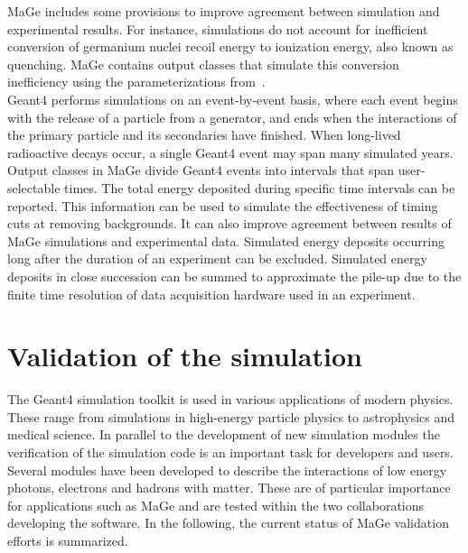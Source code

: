 \documentclass[article]{IEEEtran}
\begin{document}
     {\sc MaGe} includes some provisions to improve agreement between 
simulation and experimental results.  
For instance, simulations do not account 
for inefficient conversion of germanium nuclei recoil energy to 
ionization energy, also known as quenching.  {\sc MaGe} contains output classes that simulate this conversion inefficiency using the parameterizations from~\cite{ljungvall}. \\
 
{\sc Geant4} performs simulations on an event-by-event basis, where
each event begins with the release of a particle from a generator, and
ends when the interactions of the primary particle and its secondaries
have finished.  When long-lived radioactive decays occur, a single
{\sc Geant4} event may span many simulated years.  Output classes in
{\sc MaGe} divide {\sc Geant4} events into intervals that span user-selectable
times.  The total energy deposited during specific time intervals can
be reported.  This information can be used to simulate the
effectiveness of timing cuts at removing backgrounds.  It can also
improve agreement between results of {\sc MaGe} simulations and
experimental data.  Simulated energy deposits occurring long after the
duration of an experiment can be excluded.  Simulated energy deposits
in close succession can be summed to approximate the pile-up due to the finite time resolution
of data acquisition hardware used in an experiment. %



\section{Validation of the simulation}
\label{section:validation} 

The {\sc Geant4} simulation toolkit is used in various applications of
modern physics. These range from simulations in high-energy particle
physics to astrophysics and medical science. In parallel to the
development of new simulation modules the verification of the
simulation code is an important task for developers and users. Several
modules have been developed to describe the interactions of low energy
photons, electrons and hadrons with matter. These
are of particular importance for applications such as {\sc MaGe} and
are tested within the two collaborations developing the software. In
the following, the current status of {\sc MaGe} validation efforts is
summarized. \\
\end{document}
